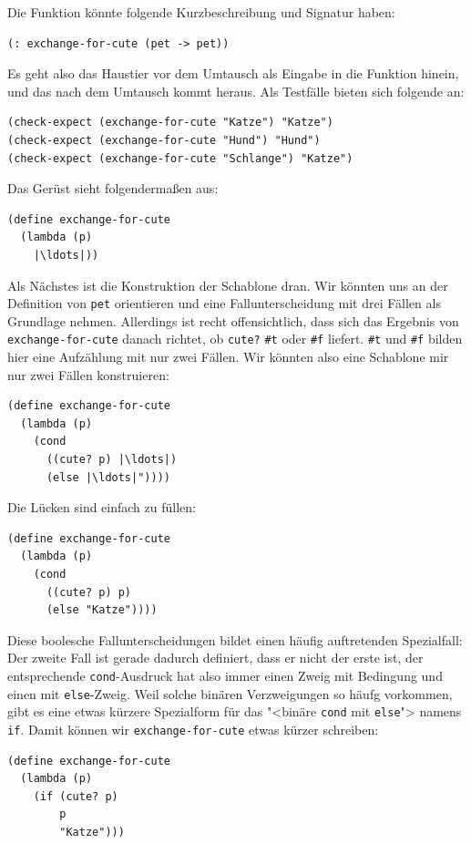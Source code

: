 Die Funktion könnte folgende Kurzbeschreibung und Signatur
haben:
%
\begin{lstlisting}
(: exchange-for-cute (pet -> pet))
\end{lstlisting}
%
Es geht also das Haustier vor dem Umtausch als Eingabe in die Funktion
hinein, und das nach dem Umtausch kommt heraus.  Als Testfälle bieten
sich folgende an:
%
\begin{lstlisting}
(check-expect (exchange-for-cute "Katze") "Katze")
(check-expect (exchange-for-cute "Hund") "Hund")
(check-expect (exchange-for-cute "Schlange") "Katze")
\end{lstlisting}
%
Das Gerüst sieht folgendermaßen aus:
%
\begin{lstlisting}
(define exchange-for-cute
  (lambda (p)
    |\ldots|))
\end{lstlisting}
%
Als Nächstes ist die Konstruktion der Schablone dran.  Wir könnten uns
an der Definition von \lstinline{pet} orientieren und eine
Fallunterscheidung mit drei Fällen als Grundlage nehmen.  Allerdings
ist recht offensichtlich, dass sich das Ergebnis von
\lstinline{exchange-for-cute} danach richtet, ob \lstinline{cute?} \lstinline{#t}
oder \lstinline{#f} liefert.   \lstinline{#t} und \lstinline{#f} bilden hier eine
Aufzählung mit nur zwei Fällen.  Wir könnten also eine Schablone mir
nur zwei Fällen konstruieren:
%
\begin{lstlisting}
(define exchange-for-cute
  (lambda (p)
    (cond
      ((cute? p) |\ldots|)
      (else |\ldots|"))))
\end{lstlisting}
%
Die Lücken sind einfach zu füllen:
%
\begin{lstlisting}
(define exchange-for-cute
  (lambda (p)
    (cond
      ((cute? p) p)
      (else "Katze"))))
\end{lstlisting}
%
Diese boolesche Fallunterscheidungen bildet einen häufig auftretenden
Spezialfall: Der zweite Fall ist gerade dadurch definiert, dass er
nicht der erste ist, der entsprechende \lstinline{cond}-Ausdruck hat also
immer einen Zweig mit Bedingung und einen mit \lstinline{else}-Zweig.
Weil solche binären Verzweigungen so häufg vorkommen, gibt es eine
etwas kürzere Spezialform für das "<binäre \lstinline{cond} mit
\lstinline{else}"> namens \lstinline{if}.  Damit
können wir \lstinline{exchange-for-cute} etwas kürzer schreiben:
%
\begin{lstlisting}
(define exchange-for-cute
  (lambda (p)
    (if (cute? p)
        p
        "Katze")))
\end{lstlisting}
